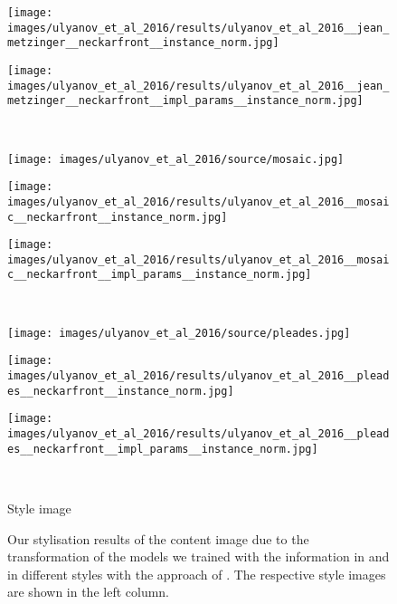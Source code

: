 \begin{figure}[H]
\begin{minipage}[t]{0.24\textwidth}
		\centering
		\texttt{[image: images/ulyanov\_et\_al\_2016/results/ulyanov\_et\_al\_2016\_\_jean\_metzinger\_\_neckarfront\_\_instance\_norm.jpg]}
	\end{minipage}
	\hfill%
	\begin{minipage}[t]{0.24\textwidth}
		\centering
		\texttt{[image: images/ulyanov\_et\_al\_2016/results/ulyanov\_et\_al\_2016\_\_jean\_metzinger\_\_neckarfront\_\_impl\_params\_\_instance\_norm.jpg]}
	\end{minipage}
	\hfill%
	\\
	\begin{minipage}[t]{0.24\textwidth}
		\centering
		\texttt{[image: images/ulyanov\_et\_al\_2016/source/mosaic.jpg]}
	\end{minipage}
	\hfill%
	\begin{minipage}[t]{0.24\textwidth}
		\centering
		\texttt{[image: images/ulyanov\_et\_al\_2016/results/ulyanov\_et\_al\_2016\_\_mosaic\_\_neckarfront\_\_instance\_norm.jpg]}
	\end{minipage}
	\hfill%
	\begin{minipage}[t]{0.24\textwidth}
		\centering
		\texttt{[image: images/ulyanov\_et\_al\_2016/results/ulyanov\_et\_al\_2016\_\_mosaic\_\_neckarfront\_\_impl\_params\_\_instance\_norm.jpg]}
	\end{minipage}
	\hfill%
	\\
	\begin{minipage}[t]{0.24\textwidth}
		\centering
		\texttt{[image: images/ulyanov\_et\_al\_2016/source/pleades.jpg]}
	\end{minipage}
	\hfill%
	\begin{minipage}[t]{0.24\textwidth}
		\centering
		\texttt{[image: images/ulyanov\_et\_al\_2016/results/ulyanov\_et\_al\_2016\_\_pleades\_\_neckarfront\_\_instance\_norm.jpg]}
	\end{minipage}
	\hfill%
	\begin{minipage}[t]{0.24\textwidth}
		\centering
		\texttt{[image: images/ulyanov\_et\_al\_2016/results/ulyanov\_et\_al\_2016\_\_pleades\_\_neckarfront\_\_impl\_params\_\_instance\_norm.jpg]}
	\end{minipage}
	\hfill%
	\\
	\begin{minipage}[t]{0.24\textwidth}
		\centering
		Style image
	\end{minipage}
	\hfill%
	\begin{minipage}[t]{0.24\textwidth}
		\centering
		\paper{}
	\end{minipage}
	\hfill%
	\begin{minipage}[t]{0.24\textwidth}
		\centering
		\implementation{}
	\end{minipage}
	\caption{Our stylisation results of the content image due to the transformation of the models we trained with the information in \paper{} and \implementation{} in different styles with the approach of  \cite{UVL2017}. The respective style images are shown in the left column.}
	\label{fig:ulyanov_et_al_2017_results}
\end{figure}

